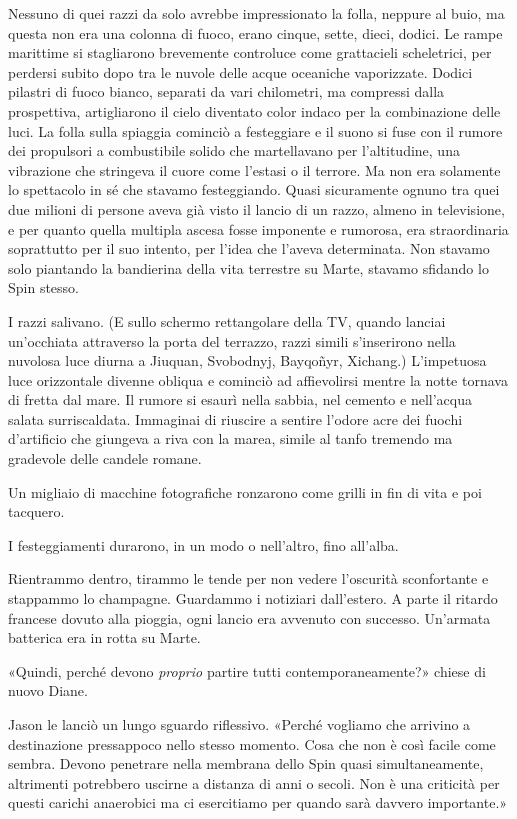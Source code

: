 Nessuno di quei razzi da solo avrebbe impressionato la folla, neppure al
buio, ma questa non era una colonna di fuoco, erano cinque, sette,
dieci, dodici. Le rampe marittime si stagliarono brevemente controluce
come grattacieli scheletrici, per perdersi subito dopo tra le nuvole
delle acque oceaniche vaporizzate. Dodici pilastri di fuoco bianco,
separati da vari chilometri, ma compressi dalla prospettiva,
artigliarono il cielo diventato color indaco per la combinazione delle
luci. La folla sulla spiaggia cominciò a festeggiare e il suono si fuse
con il rumore dei propulsori a combustibile solido che martellavano per
l'altitudine, una vibrazione che stringeva il cuore come l'estasi o il
terrore. Ma non era solamente lo spettacolo in sé che stavamo
festeggiando. Quasi sicuramente ognuno tra quei due milioni di persone
aveva già visto il lancio di un razzo, almeno in televisione, e per
quanto quella multipla ascesa fosse imponente e rumorosa, era
straordinaria soprattutto per il suo intento, per l'idea che l'aveva
determinata. Non stavamo solo piantando la bandierina della vita
terrestre su Marte, stavamo sfidando lo Spin stesso.

I razzi salivano. (E sullo schermo rettangolare della TV, quando lanciai
un'occhiata attraverso la porta del terrazzo, razzi simili s'inserirono
nella nuvolosa luce diurna a Jiuquan, Svobodnyj, Bayqoñyr, Xichang.)
L'impetuosa luce orizzontale divenne obliqua e cominciò ad affievolirsi
mentre la notte tornava di fretta dal mare. Il rumore si esaurì nella
sabbia, nel cemento e nell'acqua salata surriscaldata. Immaginai di
riuscire a sentire l'odore acre dei fuochi d'artificio che giungeva a
riva con la marea, simile al tanfo tremendo ma gradevole delle candele
romane.

Un migliaio di macchine fotografiche ronzarono come grilli in fin di
vita e poi tacquero.

I festeggiamenti durarono, in un modo o nell'altro, fino all'alba.

\separatorefiori

Rientrammo dentro, tirammo le tende per non vedere l'oscurità
sconfortante e stappammo lo champagne. Guardammo i notiziari
dall'estero. A parte il ritardo francese dovuto alla pioggia, ogni
lancio era avvenuto con successo. Un'armata batterica era in rotta su
Marte.

«Quindi, perché devono \emph{proprio} partire tutti contemporaneamente?»
chiese di nuovo Diane.

Jason le lanciò un lungo sguardo riflessivo. «Perché vogliamo che
arrivino a destinazione pressappoco nello stesso momento. Cosa che non è
così facile come sembra. Devono penetrare nella membrana dello Spin
quasi simultaneamente, altrimenti potrebbero uscirne a distanza di anni
o secoli. Non è una criticità per questi carichi anaerobici ma ci
esercitiamo per quando sarà davvero importante.»


